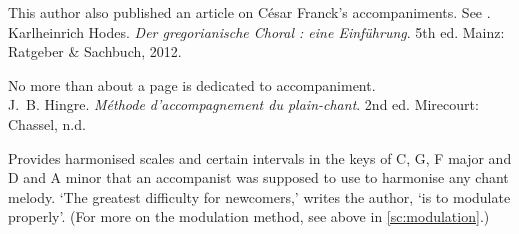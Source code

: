      \parindent=20pt
     \hangindent=20pt
     This author also published an article on César Franck's accompaniments. See \cite{Caporalilibrodiaccompagnamenti2015}.\\

    \parindent=0pt
    \hangindent=0pt
  \covid{}Karlheinrich Hodes. \emph{Der gregorianische Choral : eine Einführung}. 5th ed. Mainz:  Ratgeber \& Sachbuch, 2012.

     \parindent=20pt
     \hangindent=20pt
     No more than about a page is dedicated to accompaniment.\\

    \parindent=0pt
    \hangindent=0pt
  J.~B. Hingre. \emph{Méthode d'accompagnement du plain-chant}. 2nd ed. Mirecourt:  Chassel, n.d.

     \parindent=20pt
     \hangindent=20pt
     Provides harmonised scales and certain intervals in the keys of C, G, F major and D and A minor that an accompanist was supposed to use to harmonise any chant melody. `The greatest difficulty for newcomers,' writes the author, `is to modulate properly'. (For more on the modulation method, see above in \cref{sc:modulation}.)\\
